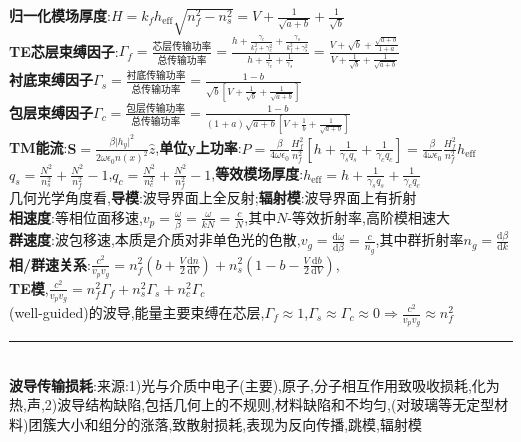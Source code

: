 \documentclass[a4paper,10pt]{article}
\providecommand{\abs}[1]{\lvert#1\rvert}
\begin{document}
\begin{multicols}{2}
\indent\textbf{归一化模场厚度}:$H=k_fh_{\text{eff}}\sqrt{n_f^2-n_s^2}=V+\frac{1}{\sqrt{a+b}}+\frac{1}{\sqrt{b}}$\\
\textbf{TE芯层束缚因子}:$\Gamma_f=\frac{\text{芯层传输功率}}{\text{总传输功率}}=\frac{h+\frac{\gamma_c}{k_f^2+\gamma_c^2}+\frac{\gamma_s}{k_f^2+\gamma_s^2}}{h+\frac{1}{\gamma_c}+\frac{1}{\gamma_s}}=\frac{V+\sqrt{b}+\frac{\sqrt{a+b}}{1+a}}{V+\frac{1}{\sqrt{b}}+\frac{1}{\sqrt{a+b}}}$\\
\indent\textbf{衬底束缚因子}$\Gamma_s=\frac{\text{衬底传输功率}}{\text{总传输功率}}=\frac{1-b}{\sqrt{b}[V+\frac{1}{\sqrt{b}}+\frac{1}{\sqrt{a+b}}]}$\\
\indent\textbf{包层束缚因子}$\Gamma_c=\frac{\text{包层传输功率}}{\text{总传输功率}}=\frac{1-b}{(1+a)\sqrt{a+b}[V+\frac{1}{b}+\frac{1}{\sqrt{a+b}}]}$\\
\textbf{TM能流}:$\bm{S}=\frac{\beta\abs{h_y}^2}{2\omega\epsilon_0n(x)^2}\hat{z}$,\textbf{单位y上功率}:$P=\frac{\beta}{4\omega\epsilon_0}\frac{H_f^2}{n_f^2}[h+\frac{1}{\gamma_sq_s}+\frac{1}{\gamma_cq_c}]=\frac{\beta}{4\omega\epsilon_0}\frac{H_f^2}{n_f^2}h_{\text{eff}}$\\
$q_s=\frac{N^2}{n_s^2}+\frac{N^2}{n_f^2}-1$,$q_c=\frac{N^2}{n_c^2}+\frac{N^2}{n_f^2}-1$,\textbf{等效模场厚度}:$h_{\text{eff}}=h+\frac{1}{\gamma_sq_s}+\frac{1}{\gamma_cq_c}$\\
几何光学角度看,\textbf{导模}:波导界面上全反射;\textbf{辐射模}:波导界面上有折射\\
\textbf{相速度}:等相位面移速,$v_p=\frac{\omega}{\beta}=\frac{\omega}{kN}=\frac{c}{N}$,其中$N$-等效折射率,高阶模相速大\\
\textbf{群速度}:波包移速,本质是介质对非单色光的色散,$v_g=\frac{\mathrm{d}\omega}{\mathrm{d}\beta}=\frac{c}{n_g}$,其中群折射率$n_g=\frac{\mathrm{d}\beta}{\mathrm{d}k}$\\
\textbf{相/群速关系}:$\frac{c^2}{v_pv_g}=n_f^2(b+\frac{V}{2}\frac{\mathrm{d}n}{\mathrm{d}V})+n_s^2(1-b-\frac{V}{2}\frac{\mathrm{d}b}{\mathrm{d}V})$,\\
\textbf{TE模},$\frac{c^2}{v_pv_g}=n_f^2\Gamma_f+n_s^2\Gamma_s+n_c^2\Gamma_c$\\
(well-guided)的波导,能量主要束缚在芯层,$\Gamma_f\approx 1$,$\Gamma_s\approx\Gamma_c\approx 0\Rightarrow\frac{c^2}{v_pv_g}\approx n_f^2$\\
\rule{\columnwidth}{.5pt}\\
\textbf{波导传输损耗}:来源:1)光与介质中电子(主要),原子,分子相互作用致吸收损耗,化为热,声,2)波导结构缺陷,包括几何上的不规则,材料缺陷和不均匀,(对玻璃等无定型材料)团簇大小和组分的涨落,致散射损耗,表现为反向传播,跳模,辐射模\\

\end{multicols}
\end{document}
